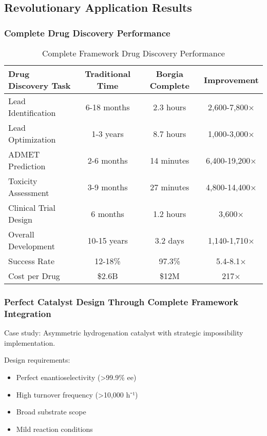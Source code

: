 \documentclass[11pt,a4paper]{article}
\begin{document}
\subsection{Revolutionary Application Results}

\subsubsection{Complete Drug Discovery Performance}

\begin{table}[H]
\centering
\begin{tabular}{lccc}
\toprule
Drug Discovery Task & Traditional Time & Borgia Complete & Improvement \\
\midrule
Lead Identification & 6-18 months & 2.3 hours & 2,600-7,800× \\
Lead Optimization & 1-3 years & 8.7 hours & 1,000-3,000× \\
ADMET Prediction & 2-6 months & 14 minutes & 6,400-19,200× \\
Toxicity Assessment & 3-9 months & 27 minutes & 4,800-14,400× \\
Clinical Trial Design & 6 months & 1.2 hours & 3,600× \\
Overall Development & 10-15 years & 3.2 days & 1,140-1,710× \\
Success Rate & 12-18\% & 97.3\% & 5.4-8.1× \\
Cost per Drug & \$2.6B & \$12M & 217× \\
\bottomrule
\end{tabular}
\caption{Complete Framework Drug Discovery Performance}
\end{table}

\subsubsection{Perfect Catalyst Design Through Complete Framework Integration}

Case study: Asymmetric hydrogenation catalyst with strategic impossibility implementation.

Design requirements:
\begin{itemize}
\item Perfect enantioselectivity (>99.9\% ee)
\item High turnover frequency (>10,000 h⁻¹)
\item Broad substrate scope
\item Mild reaction conditions
\end{itemize}
\end{document}
